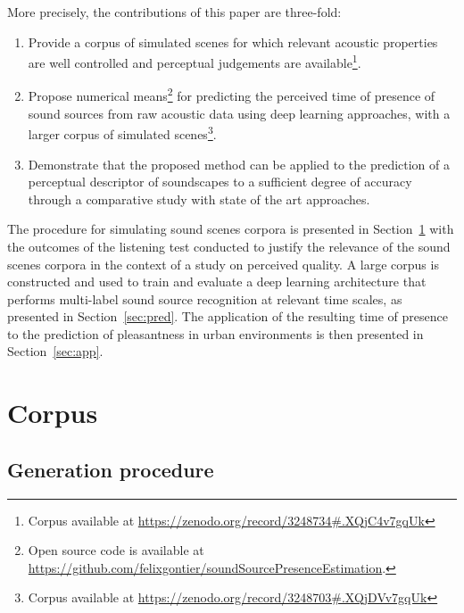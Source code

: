 \documentclass[twocolumn]{article}
\begin{document}
More precisely, the contributions of this paper are three-fold:
\begin{enumerate}
  \item Provide a corpus of simulated scenes for which relevant acoustic properties are well controlled and perceptual judgements are available\footnote{Corpus available at \url{https://zenodo.org/record/3248734\#.XQjC4v7gqUk}}.
  \item Propose numerical means\footnote{Open source code is available at \url{https://github.com/felixgontier/soundSourcePresenceEstimation}.} for predicting the perceived time of presence of sound sources from raw acoustic data using deep learning approaches, with a larger corpus of simulated scenes\footnote{Corpus available at \url{https://zenodo.org/record/3248703\#.XQjDVv7gqUk}}.
  \item Demonstrate that the proposed method can be applied to the prediction of a perceptual descriptor of soundscapes to a sufficient degree of accuracy through a comparative study with state of the art approaches.
\end{enumerate}

The procedure for simulating sound scenes corpora is presented in Section~\ref{sec:data} with the outcomes of the listening test conducted to justify the relevance of the sound scenes corpora in the context of a study on perceived quality. A large corpus is constructed and used to train and evaluate a deep learning architecture that performs multi-label sound source recognition at relevant time scales, as presented in Section~\ref{sec:pred}. The application of the resulting time of presence to the prediction of pleasantness in urban environments is then presented in Section~\ref{sec:app}.%



\section{Corpus}
\label{sec:data}


\subsection{Generation procedure}
\label{sec:data_corp}
\end{document}
